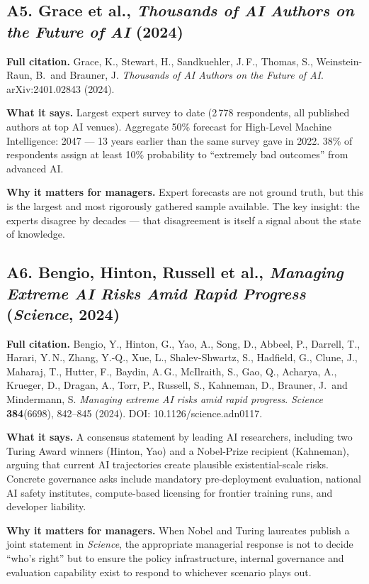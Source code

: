 \documentclass[11pt,a4paper]{article}
\begin{document}
\subsection*{A5. Grace et al., \emph{Thousands of AI Authors on the Future of
AI} (2024)}

\textbf{Full citation.}
Grace, K., Stewart, H., Sandkuehler, J.\,F., Thomas, S., Weinstein-Raun,
B.\ and Brauner, J.
\emph{Thousands of AI Authors on the Future of AI}.
arXiv:2401.02843 (2024).

\textbf{What it says.}
Largest expert survey to date (2\,778 respondents, all published authors
at top AI venues). Aggregate 50\% forecast for High-Level Machine
Intelligence: 2047 --- 13 years earlier than the same survey gave in
2022. 38\% of respondents assign at least 10\% probability to
``extremely bad outcomes'' from advanced AI.

\textbf{Why it matters for managers.}
Expert forecasts are not ground truth, but this is the largest and
most rigorously gathered sample available. The key insight: the
experts disagree by decades --- that disagreement is itself a signal
about the state of knowledge.

\subsection*{A6. Bengio, Hinton, Russell et al., \emph{Managing Extreme AI
Risks Amid Rapid Progress} (\emph{Science}, 2024)}

\textbf{Full citation.}
Bengio, Y., Hinton, G., Yao, A., Song, D., Abbeel, P., Darrell, T.,
Harari, Y.\,N., Zhang, Y.-Q., Xue, L., Shalev-Shwartz, S., Hadfield, G.,
Clune, J., Maharaj, T., Hutter, F., Baydin, A.\,G., McIlraith, S., Gao,
Q., Acharya, A., Krueger, D., Dragan, A., Torr, P., Russell, S.,
Kahneman, D., Brauner, J.\ and Mindermann, S.
\emph{Managing extreme AI risks amid rapid progress}.
\emph{Science} \textbf{384}(6698), 842--845 (2024).
DOI: 10.1126/science.adn0117.

\textbf{What it says.}
A consensus statement by leading AI researchers, including two Turing
Award winners (Hinton, Yao) and a Nobel-Prize recipient (Kahneman),
arguing that current AI trajectories create plausible existential-scale
risks. Concrete governance asks include mandatory pre-deployment
evaluation, national AI safety institutes, compute-based licensing for
frontier training runs, and developer liability.

\textbf{Why it matters for managers.}
When Nobel and Turing laureates publish a joint statement in
\emph{Science}, the appropriate managerial response is not to decide
``who's right'' but to ensure the policy infrastructure, internal
governance and evaluation capability exist to respond to whichever
scenario plays out.
\end{document}
